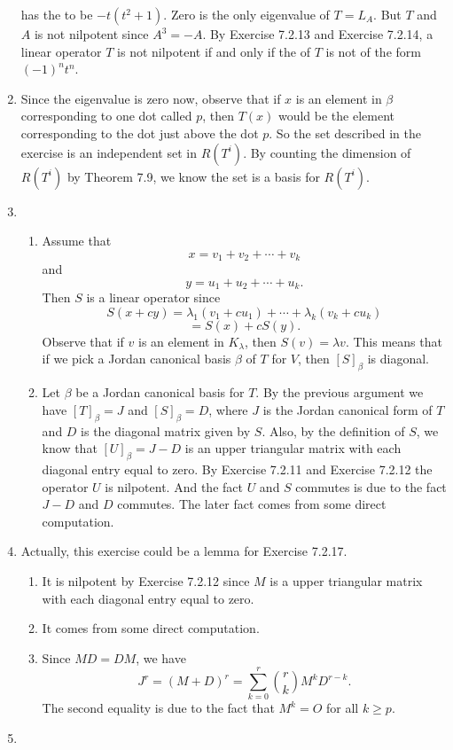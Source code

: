 \begin{enumerate}
has the \charpoly{} to be $-t(t^2+1)$. Zero is the only eigenvalue of $T=L_A$. But $T$ and $A$ is not nilpotent since $A^3=-A$. By Exercise 7.2.13 and Exercise 7.2.14, a linear operator $T$ is not nilpotent if and only if the \charpoly{} of $T$ is not of the form $(-1)^nt^n$.
\item Since the eigenvalue is zero now, observe that if $x$ is an element in $\beta$ corresponding to one dot called $p$, then $T(x)$ would be the element corresponding to the dot just above the dot $p$. So the set described in the exercise is an independent set in $R(T^i)$. By counting the dimension of $R(T^i)$ by Theorem 7.9, we know the set is a basis for $R(T^i)$.
\item \begin{enumerate}
\item Assume that 
\[x=v_1+v_2+\cdots +v_k\]
and 
\[y=u_1+u_2+\cdots +u_k.\]
Then $S$ is a linear operator since 
\[S(x+cy)=\lambda_1(v_1+cu_1)+\cdots +\lambda_k(v_k+cu_k)\]
\[=S(x)+cS(y).\]
Observe that if $v$ is an element in $K_{\lambda}$, then $S(v)=\lambda v$. This means that if we pick a Jordan canonical basis $\beta$ of $T$ for $V$, then $[S]_{\beta}$ is diagonal.
\item Let $\beta $ be a Jordan canonical basis for $T$. By the previous argument we have $[T]_{\beta}=J$ and $[S]_{\beta}=D$, where $J$ is the Jordan canonical form of $T$ and $D$ is the diagonal matrix given by $S$. Also, by the definition of $S$, we know that $[U]_{\beta}=J-D$ is an upper triangular matrix with each diagonal entry equal to zero. By Exercise 7.2.11 and Exercise 7.2.12 the operator $U$ is nilpotent. And the fact $U$ and $S$ commutes is due to the fact $J-D$ and $D$ commutes. The later fact comes from some direct computation.
\end{enumerate}
\item Actually, this exercise could be a lemma for Exercise 7.2.17. \begin{enumerate}
\item It is nilpotent by Exercise 7.2.12 since $M$ is a upper triangular matrix with each diagonal entry equal to zero.
\item It comes from some direct computation.
\item Since $MD=DM$, we have 
\[J^r=(M+D)^r=\sum_{k=0}^r{r\choose k}M^kD^{r-k}.\]
The second equality is due to the fact that $M^k=O$ for all $k\geq p$.
\end{enumerate}
\item \begin{enumerate}

\end{enumerate}
\end{enumerate}
